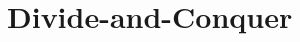 \documentclass[../Solutions]{subfiles}
\begin{document}
	\section{Divide-and-Conquer}

	
\end{document}
